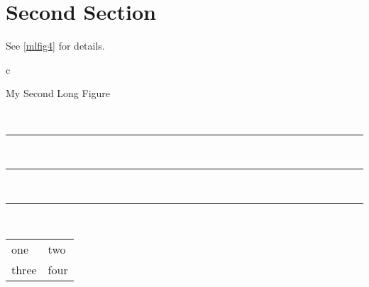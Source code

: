 \documentclass{book}
\begin{document}
\section{Second Section}

See \ref{mlfig4} for details.
\begin{longfigure}{c}
\caption{My Second Long Figure}\label{mlfig4}\\
\rule{3in}{1in}\\
\rule{3in}{1in}\\
\rule{3in}{1in}\\
\begin{tabular}{ll}
one & two \\
three & four\\
\end{tabular}
\end{longfigure}
\end{document}
